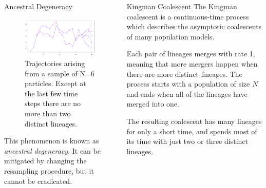 \documentclass[final, 12pt]{beamer}
\newlength{\colwidth}
\begin{document}
\begin{frame}
\begin{columns}
\begin{column}{\colwidth}
\begin{block}{Ancestral Degeneracy}
\begin{figure}
\includegraphics[width=0.9\colwidth]{degeneracy.pdf}
\caption{Trajectories arising from a sample of N=6 particles. Except at the last few time steps there are no more than two distinct lineages.}
\end{figure}

This phenomenon is known as \emph{ancestral degeneracy}. It can be mitigated by changing the resampling procedure, but it cannot be eradicated.

\end{block}
\end{column}

\begin{column}{\colwidth}
\begin{block}{Kingman Coalescent}
The Kingman coalescent is a continuous-time process which describes the asymptotic coalescents of many population models.

Each pair of lineages merges with rate 1, meaning that more mergers happen when there are more distinct lineages. The process starts with a population of size $N$ and ends when all of the lineages have merged into one.

 The resulting coalescent has many lineages for only a short time, and spends most of its time with just two or three distinct lineages.

 
 
%

\end{block}
\end{column}
\end{columns}

\end{frame}
\end{document}

